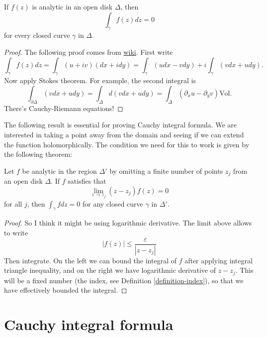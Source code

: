 \begin{theorem}[Cauchy]
\label{theorem-cauchy}
If $f(z)$ is analytic in an open disk
$\Delta$, then
\begin{equation}
\label{equationcauchy-theorem}
\int_\gamma f(z)dz=0
\end{equation}
for every closed curve $\gamma$ in $\Delta$.
\end{theorem}

\begin{proof}
The following proof comes from
\href{https://en.wikipedia.org/wiki/Cauchy
First write
$$
\int_\gamma f(z)dz=\int_\gamma(u+iv)(dx+idy)
=\int_\gamma (udx-vdy)+i\int_\gamma(vdx+udy).
$$
Now apply Stokes theorem. For example, the
second integral is
$$
\int_{\partial\Delta}(vdx+udy)=\int_\Delta
d(vdx+udy)
=\int_\Delta(\partial_xu-\partial_yv)
\text{Vol}.
$$
There's Cauchy-Riemann equations!
\end{proof}

\noindent
The following result is essential for proving
Cauchy integral formula.
We are interested in taking a point away from
the domain
and seeing if we can extend the function
holomorphically.
The condition we need for this to work is
given by the following theorem:

\begin{theorem}
\label{theorem-cauchy-removable}
Let $f$ be analytic in the region $\Delta'$
by omitting a finite number of
points $z_j$ from an open disk $\Delta$. If
$f$ satisfies that
\begin{equation}
\label{equation-removable-singularity}
\lim_{z\to z_j} (z-z_j)f(z)=0
\end{equation}
for all $j$, then $\int_\gamma fdz=0$ for any
closed curve
$\gamma$ in $\Delta'$.
\end{theorem}

\begin{proof}[Proof]
So I think it might be using logarithmic
derivative. The limit above allows to
write
$$
|f(z)|\leq \frac{\varepsilon}{|z-z_j|}
$$
Then integrate. On the left we can bound the
integral of $f$ after applying
integral triangle inequality, and on the
right we have logarithmic derivative of
$z-z_j$. This will be a fixed number (the
index, see Definition
\ref{definition-index}), so that we have
effectively bounded the integral.
\end{proof}

\section{Cauchy integral formula}
\label{sectioncauchy-integral-formula}

